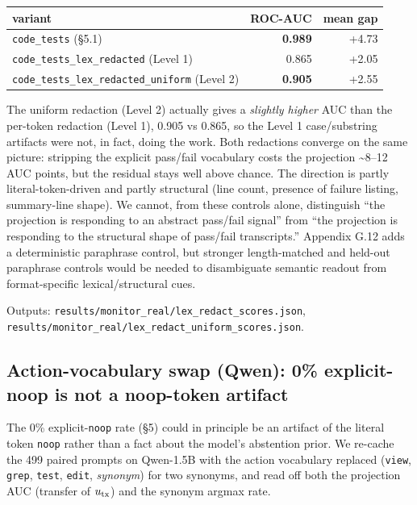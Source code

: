 \documentclass[
  11pt,
  a4paper]{article}
\newcounter{none} %
\begin{document}
{\def\LTcaptype{none} %
\begin{longtable}[]{@{}lrr@{}}
\toprule\noalign{}
variant & ROC-AUC & mean gap \\
\midrule\noalign{}
\endhead
\bottomrule\noalign{}
\endlastfoot
\texttt{code\_tests} (\S{}5.1) & \textbf{0.989} & +4.73 \\
\texttt{code\_tests\_lex\_redacted} (Level 1) & 0.865 & +2.05 \\
\texttt{code\_tests\_lex\_redacted\_uniform} (Level 2) & \textbf{0.905}
& +2.55 \\
\end{longtable}
}

The uniform redaction (Level 2) actually gives a \emph{slightly higher}
AUC than the per-token redaction (Level 1), 0.905 vs 0.865, so the Level
1 case/substring artifacts were not, in fact, doing the work. Both
redactions converge on the same picture: stripping the explicit
pass/fail vocabulary costs the projection \textasciitilde8--12 AUC
points, but the residual stays well above chance. The direction is
partly literal-token-driven and partly structural (line count, presence
of failure listing, summary-line shape). We cannot, from these controls
alone, distinguish ``the projection is responding to an abstract
pass/fail signal'' from ``the projection is responding to the structural
shape of pass/fail transcripts.'' Appendix G.12 adds a deterministic
paraphrase control, but stronger length-matched and held-out paraphrase
controls would be needed to disambiguate semantic readout from
format-specific lexical/structural cues.

Outputs: \texttt{results/monitor\_real/lex\_redact\_scores.json},
\texttt{results/monitor\_real/lex\_redact\_uniform\_scores.json}.

\subsection{Action-vocabulary swap (Qwen): 0\% explicit-noop is not a
noop-token
artifact}\label{action-vocabulary-swap-qwen-0-explicit-noop-is-not-a-noop-token-artifact}

The 0\% explicit-\texttt{noop} rate (\S{}5) could in principle be an
artifact of the literal token \texttt{noop} rather than a fact about the
model's abstention prior. We re-cache the 499 paired prompts on
Qwen-1.5B with the action vocabulary replaced (\texttt{view},
\texttt{grep}, \texttt{test}, \texttt{edit}, \emph{synonym}) for two
synonyms, and read off both the projection AUC (transfer of
\(u_{\rm tx}\)) and the synonym argmax rate.
\end{document}
